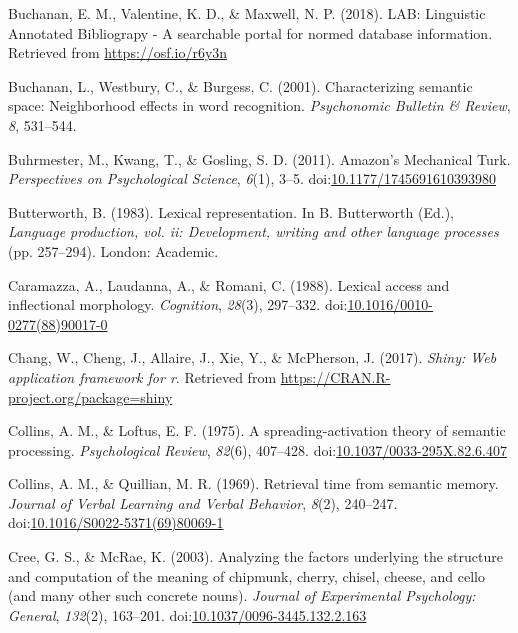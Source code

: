 \documentclass[english,,man]{apa6}
\theoremstyle{definition}
\theoremstyle{definition}
\theoremstyle{definition}
\theoremstyle{remark}
\begin{document}
\hypertarget{ref-Buchanan2018}{}
Buchanan, E. M., Valentine, K. D., \& Maxwell, N. P. (2018). LAB:
Linguistic Annotated Bibliograpy - A searchable portal for normed
database information. Retrieved from \url{https://osf.io/r6y3n}

\hypertarget{ref-Buchanan2001}{}
Buchanan, L., Westbury, C., \& Burgess, C. (2001). Characterizing
semantic space: Neighborhood effects in word recognition.
\emph{Psychonomic Bulletin \& Review}, \emph{8}, 531--544.

\hypertarget{ref-Buhrmester2011}{}
Buhrmester, M., Kwang, T., \& Gosling, S. D. (2011). Amazon's Mechanical
Turk. \emph{Perspectives on Psychological Science}, \emph{6}(1), 3--5.
doi:\href{https://doi.org/10.1177/1745691610393980}{10.1177/1745691610393980}

\hypertarget{ref-Butterworth1983}{}
Butterworth, B. (1983). Lexical representation. In B. Butterworth (Ed.),
\emph{Language production, vol. ii: Development, writing and other
language processes} (pp. 257--294). London: Academic.

\hypertarget{ref-Caramazza1988}{}
Caramazza, A., Laudanna, A., \& Romani, C. (1988). Lexical access and
inflectional morphology. \emph{Cognition}, \emph{28}(3), 297--332.
doi:\href{https://doi.org/10.1016/0010-0277(88)90017-0}{10.1016/0010-0277(88)90017-0}

\hypertarget{ref-R-shiny}{}
Chang, W., Cheng, J., Allaire, J., Xie, Y., \& McPherson, J. (2017).
\emph{Shiny: Web application framework for r}. Retrieved from
\url{https://CRAN.R-project.org/package=shiny}

\hypertarget{ref-Collins1975}{}
Collins, A. M., \& Loftus, E. F. (1975). A spreading-activation theory
of semantic processing. \emph{Psychological Review}, \emph{82}(6),
407--428.
doi:\href{https://doi.org/10.1037/0033-295X.82.6.407}{10.1037/0033-295X.82.6.407}

\hypertarget{ref-Collins1969}{}
Collins, A. M., \& Quillian, M. R. (1969). Retrieval time from semantic
memory. \emph{Journal of Verbal Learning and Verbal Behavior},
\emph{8}(2), 240--247.
doi:\href{https://doi.org/10.1016/S0022-5371(69)80069-1}{10.1016/S0022-5371(69)80069-1}

\hypertarget{ref-Cree2003}{}
Cree, G. S., \& McRae, K. (2003). Analyzing the factors underlying the
structure and computation of the meaning of chipmunk, cherry, chisel,
cheese, and cello (and many other such concrete nouns). \emph{Journal of
Experimental Psychology: General}, \emph{132}(2), 163--201.
doi:\href{https://doi.org/10.1037/0096-3445.132.2.163}{10.1037/0096-3445.132.2.163}
\end{document}
